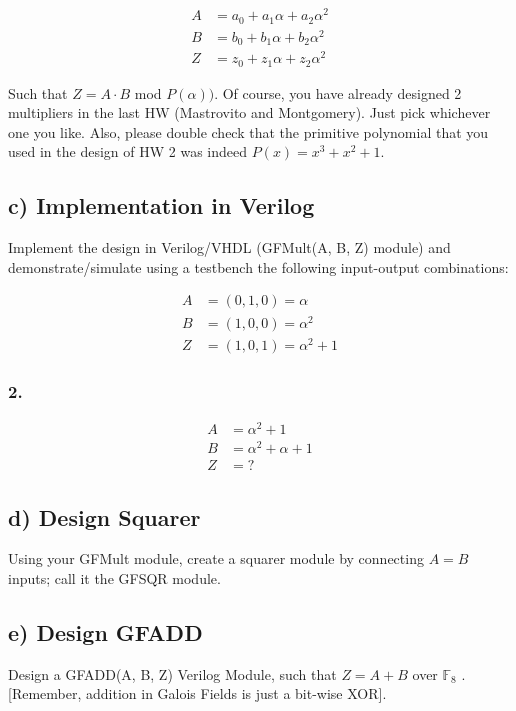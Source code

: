 \documentclass[a4paper,11pt]{exam}
\begin{document}
\begin{align*}
A &= a_0 + a_1 \alpha + a_2\alpha^2\\
B &= b_0 + b_1 \alpha + b_2\alpha^2\\
Z &= z_0 + z_1 \alpha + z_2\alpha^2
\end{align*}

Such that \(Z = A \cdot B\) mod \(P(\alpha))\). Of course, you have already designed 2 multipliers in the last HW (Mastrovito and Montgomery). Just pick whichever one you like. Also, please double check that the primitive polynomial that you used in the design of HW 2 was indeed \(P(x) = x^3 + x^2 + 1\).


\subsection{c) Implementation in Verilog}
\label{sec:orgbd97ada}
Implement the design in Verilog/VHDL (GFMult(A, B, Z) module) and demonstrate/simulate using a testbench the following input-output combinations:


\begin{align*}
 A &= (0, 1, 0) = \alpha \\
 B &= (1, 0, 0) = \alpha^2\\
 Z &= (1, 0, 1) = \alpha^2 + 1
\end{align*}
\subsubsection{2.}
\label{sec:orgc8a414c}

\begin{align*}
A &= \alpha^2 + 1\\
B &= \alpha^2 + \alpha + 1
\\Z &= ?
\end{align*}
\subsection{d) Design Squarer}
\label{sec:org6ceee77}
Using your GFMult module, create a squarer module by connecting \(A = B\) inputs; call it the
GFSQR module.

\subsection{e) Design GFADD}
\label{sec:orgaa33f24}
Design a GFADD(A, B, Z) Verilog Module, such that \(Z = A+B\) over \(\mathbb{F}_8\) . [Remember, addition
in Galois Fields is just a bit-wise XOR].
\end{document}

